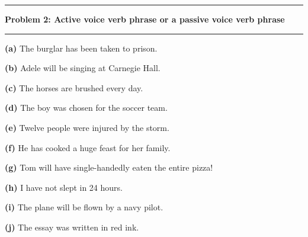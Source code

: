 \documentclass[11pt]{article}
\newcommand\question[2]{\vspace{.25in}\hrule\textbf{#1: #2}\vspace{.5em}\hrule\vspace{.10in}}
\renewcommand\part[1]{\vspace{.10in}\textbf{(#1)}}
\begin{document}
\question{Problem 2}{Active voice verb phrase or a passive voice verb phrase}

\part{a} The burglar has been taken to prison.

\part{b} Adele will be singing at Carnegie Hall.

\part{c} The horses are brushed every day.

\part{d} The boy was chosen for the soccer team.

\part{e} Twelve people were injured by the storm.

\part{f} He has cooked a huge feast for her family.

\part{g} Tom will have single-handedly eaten the entire pizza!

\part{h} I have not slept in 24 hours.

\part{i} The plane will be flown by a navy pilot.

\part{j} The essay was written in red ink.
\end{document}
